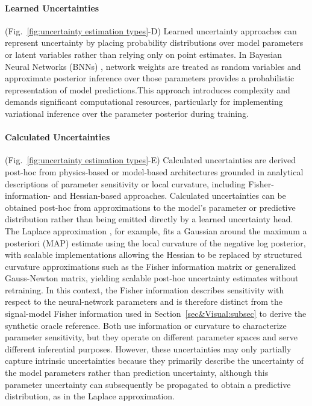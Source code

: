 \paragraph{Learned Uncertainties} (Fig.~\ref{fig:uncertainty estimation types}-D) Learned uncertainty approaches can represent uncertainty by placing probability distributions over model parameters or latent variables rather than relying only on point estimates. In Bayesian Neural Networks (BNNs) \cite{Blundell2015}, network weights are treated as random variables and approximate posterior inference over those parameters provides a probabilistic representation of model predictions.This approach introduces complexity and demands significant computational resources, particularly for implementing variational inference over the parameter posterior during training.

\paragraph{Calculated Uncertainties} (Fig.~\ref{fig:uncertainty estimation types}-E) Calculated uncertainties are derived post-hoc from physics-based or model-based architectures grounded in analytical descriptions of parameter sensitivity or local curvature, including Fisher-information- and Hessian-based approaches. Calculated uncertainties can be obtained post-hoc from approximations to the model's parameter or predictive distribution rather than being emitted directly by a learned uncertainty head. The Laplace approximation \cite{Daxberger2021}, for example, fits a Gaussian around the maximum a posteriori (MAP) estimate using the local curvature of the negative log posterior, with scalable implementations allowing the Hessian to be replaced by structured curvature approximations such as the Fisher information matrix or generalized Gauss-Newton matrix, yielding scalable post-hoc uncertainty estimates without retraining. In this context, the Fisher information describes sensitivity with respect to the neural-network parameters and is therefore distinct from the signal-model Fisher information used in Section~\ref{sec&Visual:subsec} to derive the synthetic oracle \CRLB reference. Both use information or curvature to characterize parameter sensitivity, but they operate on different parameter spaces and serve different inferential purposes. However, these uncertainties may only partially capture intrinsic uncertainties because they primarily describe the uncertainty of the model parameters rather than prediction uncertainty, although this parameter uncertainty can subsequently be propagated to obtain a predictive distribution, as in the Laplace approximation.

